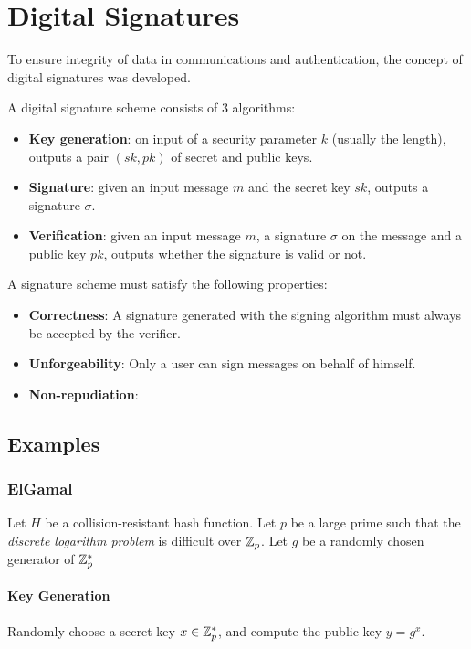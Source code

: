 \section{Digital Signatures}
To ensure integrity of data in communications and authentication, the concept of digital signatures was developed. 

A digital signature scheme consists of 3 algorithms:
\begin{itemize}
    \item \textbf{Key generation}: on input of a security parameter $k$ (usually the length), outputs a pair $(sk, pk)$ of secret and public keys.
    \item \textbf{Signature}: given an input message $m$ and the secret key $sk$, outputs a signature $\sigma$.
    \item \textbf{Verification}: given an input message $m$, a signature $\sigma$ on the message and a public key $pk$, outputs whether the signature is valid or not.
\end{itemize}

A signature scheme must satisfy the following properties:
\begin{itemize}
    \item \textbf{Correctness}: A signature generated with the signing algorithm must always be accepted by the verifier.
    \item \textbf{Unforgeability}: Only a user can sign messages on behalf of himself.
    \item \textbf{Non-repudiation}: 
\end{itemize}

\subsection{Examples}
\subsubsection{ElGamal}
Let $H$ be a collision-resistant hash function. Let $p$ be a large prime such that the \textit{discrete logarithm problem} is difficult over ${\mathbb Z}_p$. Let $g$ be a randomly chosen generator of ${\mathbb Z}_p^\ast$

\paragraph{Key Generation}

Randomly choose a secret key $x \in {\mathbb Z}_p^\ast$, and compute the public key $y = g^x$.

